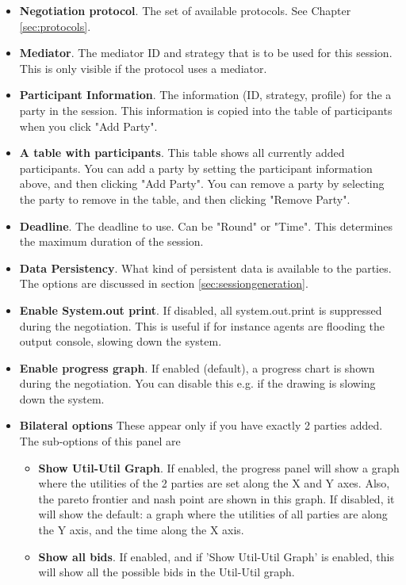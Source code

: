 \documentclass[]{article}
\begin{document}
\medskip
\begin{minipage}{.8 \textwidth}
\begin{itemize}
	\item \textbf{Negotiation protocol}. The set of available protocols. See Chapter \ref{sec:protocols}.
	\item \textbf{Mediator}. The mediator ID and strategy that is to be used for this session. This is only visible if the protocol uses a mediator.
	\item \textbf{Participant Information}. The information (ID, strategy, profile) for the a party in the session. This information is copied into the table of participants when you click "Add Party".
	\item \textbf{A table with participants}. This table shows all currently added participants. You can add a party by setting the participant information above, and then clicking "Add Party". You can remove a party by selecting the party to remove in the table, and then clicking "Remove Party". 
	\item \textbf{Deadline}. The deadline to use. Can be "Round" or "Time". This determines the maximum duration of the session.
	\item \textbf{Data Persistency}. What kind of persistent data is available to the parties. The options are discussed in section \ref{sec:sessiongeneration}.
	\item \textbf{Enable System.out print}. If disabled, all system.out.print is suppressed during the negotiation. This is useful if for instance agents are flooding the output console, slowing down the system.
		\item \textbf{Enable progress graph}. If enabled (default), a progress chart is shown during the negotiation. You can disable this e.g. if the drawing is slowing down the system.
\item \textbf{Bilateral options} These appear only if you have exactly 2 parties added. The sub-options of this panel are
	\begin{itemize}
	\item \textbf{Show Util-Util Graph}. If enabled, the progress panel will show a graph where the utilities of the 2 parties are set along the X and Y axes. Also, the pareto frontier and nash point are shown in this graph. If disabled, it will show the default: a graph where the utilities of all parties are along the Y axis, and the time along the X axis. 
	\item \textbf{Show all bids}.  If enabled, and if 'Show Util-Util Graph' is enabled, this will show all the possible bids in the Util-Util graph.
	\end{itemize}

\end{itemize}
\end{minipage}
\medskip
\end{document}
